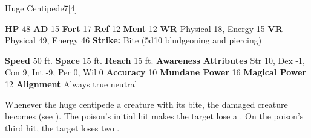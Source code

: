   \begin{monsubsection}{Huge Centipede}{7}[4]
    \vspace{-1em}\vspace{-1em}
    \vspace{0em}

    
    

    \begin{spellcontent}
      \begin{spelltargetinginfo}
        \pari \textbf{HP} 48 \monsep
          \textbf{AD} 15 \monsep
          \textbf{Fort} 17 \monsep
          \textbf{Ref} 12 \monsep
          \textbf{Ment} 12
        \pari \textbf{WR} Physical 18, Energy 15 \monsep
        \textbf{VR} Physical 49, Energy 46
        \pari \textbf{Strike:}
            Bite  (5d10 bludgeoning and piercing)
      \end{spelltargetinginfo}
    \end{spellcontent}
    \begin{monsterfooter}
      \pari \textbf{Speed} 50 ft. \monsep
        \textbf{Space} 15 ft. \monsep
        \textbf{Reach} 15 ft.
      \pari \textbf{Awareness} 
      \pari \textbf{Attributes}
        Str 10, Dex -1,
        Con 9, Int -9,
        Per 0, Wil 0
      \pari \textbf{Accuracy} 10 \monsep
        \textbf{Mundane Power} 16 \monsep
      \textbf{Magical Power} 12
      \pari \textbf{Alignment} Always true neutral
    \end{monsterfooter}
  \end{monsubsection}
        Whenever the huge centipede  a creature with its bite,
          the damaged creature becomes  (see ).
        The poison's initial hit makes the target lose a .
        On the poison's third hit, the target loses two .
  

